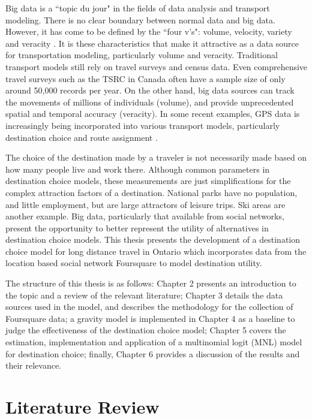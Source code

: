 Big data is a ``topic du jour" in the fields of data analysis and transport modeling. There is no clear boundary between normal data and big data. However, it has come to be defined by the ``four v's": volume, velocity, variety and veracity \parencite{beyer2012importance}. It is these characteristics that make it attractive as a data source for transportation modeling, particularly volume and veracity. Traditional transport models still rely on travel surveys and census data. Even comprehensive travel surveys such as the TSRC in Canada  often have a sample size of only around 50,000 records per year. On the other hand, big data sources can track the movements of millions of individuals (volume), and provide unprecedented spatial and temporal accuracy (veracity). In some recent examples, GPS data is increasingly being incorporated into various transport models, particularly destination choice \parencite{schonfelder2006analysis, pan2006cellular} and route assignment \parencite{broach2012cyclists, menghini2010route}.

The choice of the destination made by a traveler is not necessarily made based on how many people live and work there. Although common parameters in destination choice models, these measurements are just simplifications for the complex attraction factors of a destination. National parks have no population, and little employment, but are large attractors of leisure trips. Ski areas are another example. Big data, particularly that available from social networks, present the opportunity to better represent the utility of alternatives in destination choice models. This thesis presents the development of a destination choice model for long distance travel in Ontario which incorporates  data from the location based social network Foursquare to model destination utility.

The structure of this thesis is as follows: Chapter 2 presents an introduction to the topic and a review of the relevant literature; Chapter 3 details the data sources used in the model, and describes the methodology for the collection of Foursquare data; a gravity model is implemented in Chapter 4 as a baseline to judge the effectiveness of  the destination choice model; Chapter 5 covers the estimation, implementation and application of a multinomial logit (MNL) model for destination choice; finally, Chapter 6 provides a discussion of the results and their relevance.


\chapter{Literature Review}
\label{section:lit-review}

